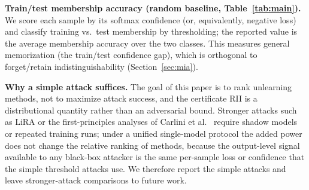 \documentclass[smallextended]{svjour3}       %
\begin{document}
\textbf{Train/test membership accuracy (random baseline, Table~\ref{tab:main}).} We score each sample by its softmax confidence (or, equivalently, negative loss) and classify training vs.\ test membership by thresholding; the reported value is the average membership accuracy over the two classes. This measures general memorization (the train/test confidence gap), which is orthogonal to forget/retain indistinguishability (Section~\ref{sec:mia}).

\textbf{Why a simple attack suffices.} The goal of this paper is to rank unlearning methods, not to maximize attack success, and the certificate RII is a distributional quantity rather than an adversarial bound. Stronger attacks such as LiRA or the first-principles analyses of Carlini et al.~\cite{carlini2022membership} require shadow models or repeated training runs; under a unified single-model protocol the added power does not change the relative ranking of methods, because the output-level signal available to any black-box attacker is the same per-sample loss or confidence that the simple threshold attacks use. We therefore report the simple attacks and leave stronger-attack comparisons to future work.


\end{document}
